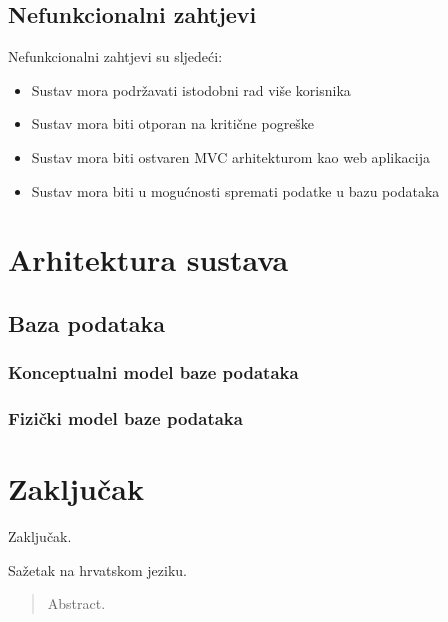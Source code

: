 \documentclass[times, utf8, zavrsni]{fer}
\begin{document}
\section{Nefunkcionalni zahtjevi}
Nefunkcionalni zahtjevi su sljedeći:

\begin{itemize}
	\item Sustav mora podržavati istodobni rad više korisnika
	\item Sustav mora biti otporan na kritične pogreške
	\item Sustav mora biti ostvaren MVC arhitekturom kao web aplikacija
	\item Sustav mora biti u mogućnosti spremati podatke u bazu podataka
\end{itemize}

\chapter{Arhitektura sustava}
\section{Baza podataka}
\subsection{Konceptualni model baze podataka}

\subsection{Fizički model baze podataka}


\chapter{Zaključak}
Zaključak.




\begin{sazetak}
	Sažetak na hrvatskom jeziku.
	
\end{sazetak}

\begin{abstract}
	Abstract.
	
\end{abstract}
\end{document}
